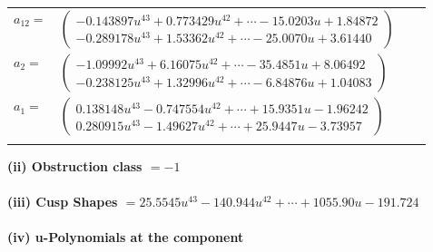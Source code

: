 \documentclass[1p]{elsarticle_modified}
\theoremstyle{definition}
\begin{document}
\begin{tabular}{m{7pt} m{180pt} m{7pt} m{180pt} }
\flushright $a_{12}=$&$\begin{pmatrix}-0.143897 u^{43}+0.773429 u^{42}+\cdots-15.0203 u+1.84872\\-0.289178 u^{43}+1.53362 u^{42}+\cdots-25.0070 u+3.61440\end{pmatrix}$ \\
\flushright $a_{2}=$&$\begin{pmatrix}-1.09992 u^{43}+6.16075 u^{42}+\cdots-35.4851 u+8.06492\\-0.238125 u^{43}+1.32996 u^{42}+\cdots-6.84876 u+1.04083\end{pmatrix}$ \\
\flushright $a_{1}=$&$\begin{pmatrix}0.138148 u^{43}-0.747554 u^{42}+\cdots+15.9351 u-1.96242\\0.280915 u^{43}-1.49627 u^{42}+\cdots+25.9447 u-3.73957\end{pmatrix}$\\&\end{tabular}
\flushleft \textbf{(ii) Obstruction class $= -1$}\\~\\
\flushleft \textbf{(iii) Cusp Shapes $= 25.5545 u^{43}-140.944 u^{42}+\cdots+1055.90 u-191.724$}\\~\\
\newpage\renewcommand{\arraystretch}{1}
\flushleft \textbf{(iv) u-Polynomials at the component}\newline \\
\end{document}
